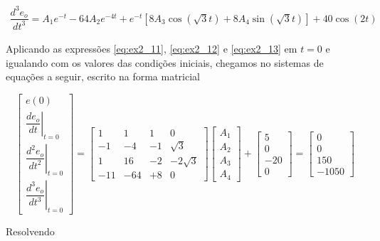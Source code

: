 \documentclass{article}
\numberwithin{equation}{section}
\newcommand{\deo}[1]{\dfrac{d^{#1}e_o}{dt^{#1}}}
\let\dfr\dfrac
\begin{document}
\begin{equation}
    \begin{split}
        \label{eq:ex2_13}
        \deo{3} = A_1e^{-t} -64A_2e^{-4t} + e^{-t}\left[8A_3\cos\left(\sqrt{3}t\right)+8A_4\sin\left(\sqrt{3}t\right)\right] + 40\cos\left(2t\right)
    \end{split}
\end{equation}

\noindent Aplicando as expressões \eqref{eq:ex2_11}, \eqref{eq:ex2_12} e \eqref{eq:ex2_13} em $t=0$ e igualando com os valores das condições iniciais, chegamos no sistemas de equações a seguir, escrito na forma matricial

\begin{equation*}
    \begin{bmatrix}
        e(0)\\[2mm]
        \left.\dfr{de_o}{dt}\right|_{t=0}\\[4mm]
        \left.\deo{2}\right|_{t=0}\\[4mm]
        \left.\deo{3}\right|_{t=0}
    \end{bmatrix}
    =
    \begin{bmatrix}
        1 & 1 & 1 & 0\\[6.5mm]
        -1 & -4 & -1 & \sqrt{3}\\[6.5mm]
        1 & 16 & -2 & -2\sqrt{3}\\[6.5mm]
        -11 & -64 & +8 & 0
    \end{bmatrix}
    \begin{bmatrix}
        A_1\\[6.5mm]
        A_2\\[6.5mm]
        A_3\\[6.5mm]
        A_4
    \end{bmatrix}
    +
    \begin{bmatrix}
        5\\[6.5mm]
        0\\[6.5mm]
        -20\\[6.5mm]
        0
    \end{bmatrix}
    =
    \begin{bmatrix}
        0\\[6.5mm]
        0\\[6.5mm]
        150\\[6.5mm]
        -1050
    \end{bmatrix}
\end{equation*}

\noindent Resolvendo
\end{document}
